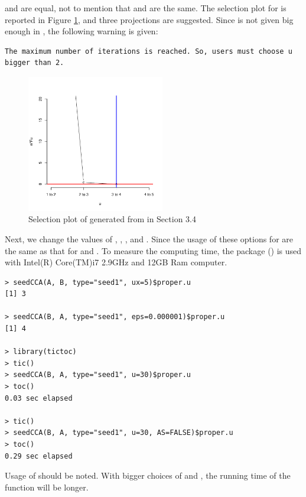   and   are equal,
not to mention that   and  are the same.
The selection plot for  is reported in Figure \ref{data1u}, and
three projections are suggested.
Since  is not given big enough in ,
the following warning is given:
\begin{verbatim}
The maximum number of iterations is reached. So, users must choose u bigger than 2.
\end{verbatim}
%
\begin{figure}\begin{center}
\includegraphics[width=6cm,height=6cm]{data1u.pdf}
\vspace{-5mm} \caption{Selection plot of   generated from
 in Section 3.4}
\label{data1u}
\end{center}\end{figure}
%

Next, we change the values of , , , and .
Since the usage of these options for  are the same as
that for  and .
To measure the computing time, the  package (\cite{tictoc}) is used
with Intel(R) Core(TM)i7 2.9GHz and 12GB Ram computer.
%
\begin{verbatim}
> seedCCA(A, B, type="seed1", ux=5)$proper.u
[1] 3

> seedCCA(B, A, type="seed1", eps=0.000001)$proper.u
[1] 4

> library(tictoc)
> tic()
> seedCCA(B, A, type="seed1", u=30)$proper.u
> toc()
0.03 sec elapsed

> tic()
> seedCCA(B, A, type="seed1", u=30, AS=FALSE)$proper.u
> toc()
0.29 sec elapsed
\end{verbatim}
%
Usage of  should be noted. With bigger choices of  and ,
the running time of the function will be longer.
